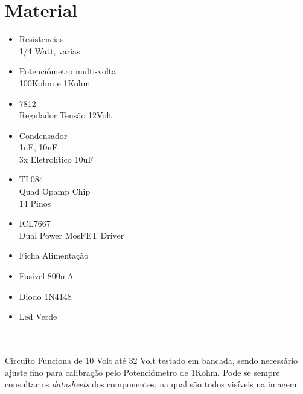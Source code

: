 \section{Material}
\begin{minipage}[t]{.4\linewidth}
	\begin{itemize}
		\setlength\itemsep{-0.5em}
		\item Resistencias \\
		1/4 Watt, varias.
		\item Potenciómetro multi-volta \\
		100Kohm e 1Kohm
		\item 7812 \\
		Regulador Tensão 12Volt
		\item Condensador \\
		1nF, 10nF  \\
		3x Eletrolítico 10uF
		
	\end{itemize}
\end{minipage}
\begin{minipage}[t]{.31\linewidth}
	\begin{itemize}
		\setlength\itemsep{-0.5em}
		\item TL084 \\
		Quad Opamp Chip \\
		14 Pinos
		\item ICL7667 \\
		Dual Power MosFET Driver
		\item Ficha Alimentação
		\item Fusível 800mA
		\item Diodo 1N4148
		\item Led Verde \\
	\end{itemize}
\end{minipage}\\
\\
Circuito Funciona de 10 Volt até 32 Volt testado em bancada, sendo necessário ajuste fino para calibração pelo Potenciómetro de  1Kohm.
Pode se sempre consultar os {\it datasheets} dos componentes, na qual são todos visíveis na imagem.
